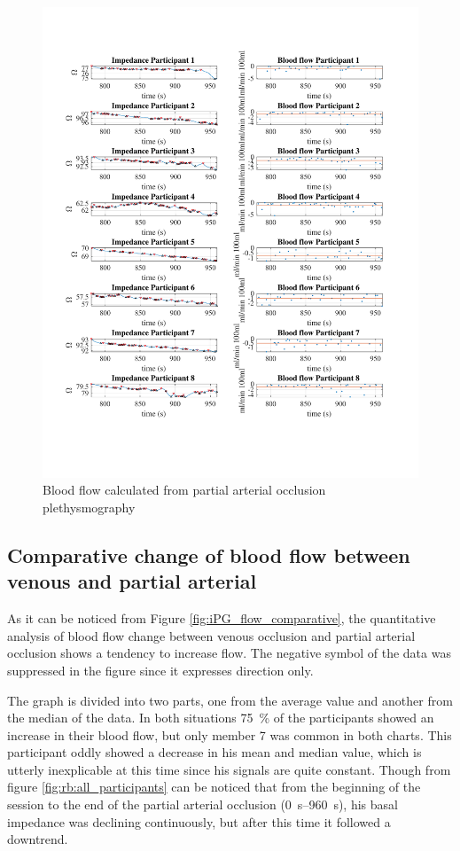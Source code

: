 \begin{figure}
	\includegraphics[width=\textwidth,height=\textheight,keepaspectratio,trim={0.5cm 0.5cm 2cm 2cm},clip]{figure13}    
	\caption{Blood flow calculated from partial arterial occlusion plethysmography}
	\label{fig:blood_flow:arterial_occlusion}
\end{figure}

\subsection{Comparative change of blood flow between venous and partial arterial}
\label{section5.4.3}
As it can be noticed from Figure \ref{fig:iPG_flow_comparative}, the quantitative analysis of blood flow change between venous occlusion and partial arterial occlusion shows a tendency to increase flow. The negative symbol of the data was suppressed in the figure since it expresses direction only. 

The graph is divided into two parts, one from the average value and another from the median of the data.  In both situations \SI{75}{\percent} of the participants showed an increase in their blood flow, but only member 7 was common in both charts. This participant oddly showed a decrease in his mean and median value, which is utterly inexplicable at this time since his signals are quite constant. Though from figure \ref{fig:rb:all_participants} can be noticed that from the beginning of the session to the end of the partial arterial occlusion  (\SIrange{0}{960}{\second}), his basal impedance was declining continuously, but after this time it followed a downtrend. 

